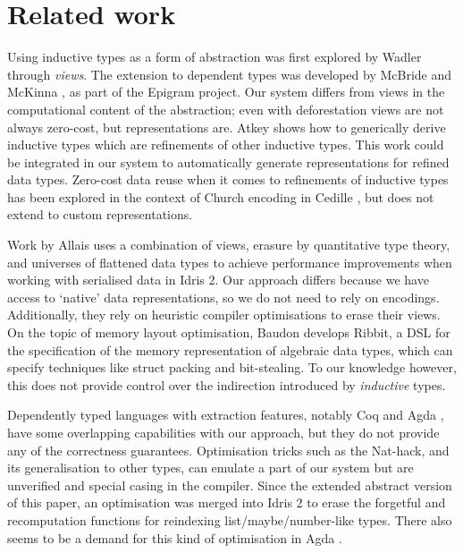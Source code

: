 \section{Related work}

Using inductive types as a form of abstraction was first explored by Wadler
\cite{Wadler1987-zp} through \emph{views}. The extension to dependent types
was developed by McBride and McKinna \cite{Mcbride2004-fd}, as part of the
Epigram project. Our system differs from views in the computational content
of the abstraction; even with deforestation \cite{Wadler1990-yo} views are not
always zero-cost, but representations are.
Atkey \cite{Atkey2011-ex} shows how to generically derive inductive types which
are refinements of other inductive types. This work could be integrated in our
system to automatically generate representations for refined data types.
Zero-cost data reuse when it comes to refinements of inductive types has been
explored in the context of Church encoding in Cedille \cite{Diehl2018-ba}, but
does not extend to custom representations.

Work by Allais \cite{Allais2023-pf,Allais2023-zq} uses a combination of views,
erasure by quantitative type theory, and universes of flattened data types to
achieve performance improvements when working with serialised data in Idris 2.
Our approach differs because we have access to `native' data representations, so
we do not need to rely on encodings. Additionally, they rely on heuristic
compiler optimisations to erase their views. On the topic of memory layout
optimisation, Baudon \cite{Baudon2023-cy} develops Ribbit, a DSL for the
specification of the memory representation of algebraic data types, which can
specify techniques like struct packing and bit-stealing. To our knowledge
however, this does not provide control over the indirection introduced by
\emph{inductive} types.

Dependently typed languages with extraction features, notably Coq
\cite{coq-extraction} and Agda \cite{agda-extraction}, have some overlapping
capabilities with our approach, but they do not provide any of the correctness
guarantees. Optimisation tricks such as the Nat-hack, and its generalisation to
other types, can emulate a part of our system but are unverified and special
casing in the compiler. Since the extended abstract version of this paper, an
optimisation was merged into Idris 2 \cite{idris-pr} to erase the forgetful and
recomputation functions for reindexing list/maybe/number-like types.
There also seems to be a demand for this kind of optimisation in Agda
\cite{agda-issue}.

